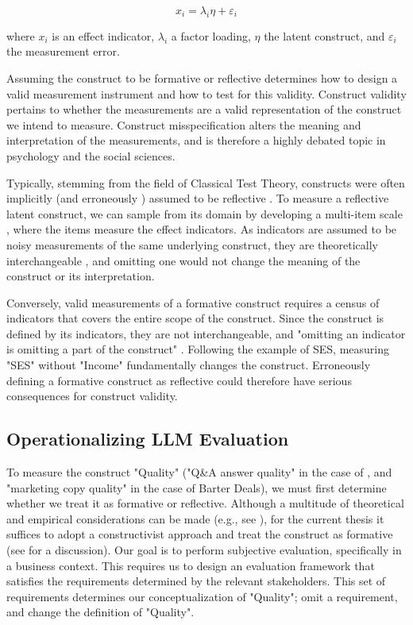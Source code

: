 \begin{equation}\label{formative_model}
    x_i = \lambda_i \eta + \varepsilon_i
\end{equation}

where $x_i$ is an effect indicator, $\lambda_i$ a factor loading, $\eta$ the latent construct, and $\varepsilon_i$ the measurement error.


Assuming the construct to be formative or reflective determines how to design a valid measurement instrument and how to test for this validity. Construct validity pertains to whether the measurements are a valid representation of the construct we intend to measure. Construct misspecification alters the meaning and interpretation of the measurements, and is therefore a highly debated topic in psychology and the social sciences. 

Typically, stemming from the field of Classical Test Theory, constructs were often implicitly (and erroneously \citep{bollen1991conventional}) assumed to be reflective \citep{nunnally1996psychometric}. To measure a reflective latent construct, we can sample from its domain by developing a multi-item scale \citep{diamantopoulos2001index}, where the items measure the effect indicators. As indicators are assumed to be noisy measurements of the same underlying construct, they are theoretically interchangeable \citep{coltman2008formative}, and omitting one would not change the meaning of the construct or its interpretation. 

Conversely, valid measurements of a formative construct requires a census of indicators that covers the entire scope of the construct. Since the construct is defined by its indicators, they are not interchangeable, and "omitting an indicator is omitting a part of the construct" \citep{bollen1991conventional}. Following the example of SES, measuring "SES" without "Income" fundamentally changes the construct. Erroneously defining a formative construct as reflective could therefore have serious consequences for construct validity.

\subsection{Operationalizing LLM Evaluation}

To measure the construct "Quality" ("Q\&A answer quality" in the case of \citet{li_using_2022}, and "marketing copy quality" in the case of Barter Deals), we must first determine whether we treat it as formative or reflective. Although a multitude of theoretical and empirical considerations can be made (e.g., see \citet{coltman2008formative}), for the current thesis it suffices to adopt a constructivist approach and treat the construct as formative (see \citet{borsboom2003theoretical} for a discussion). Our goal is to perform subjective evaluation, specifically in a business context. This requires us to design an evaluation framework that satisfies the requirements determined by the relevant stakeholders. This set of requirements determines our conceptualization of "Quality"; omit a requirement, and change the definition of "Quality". 

